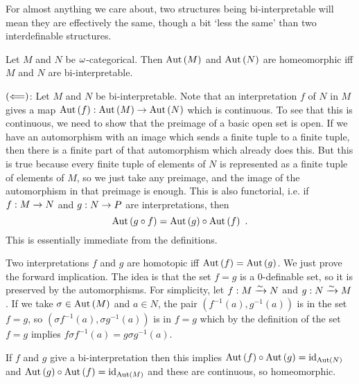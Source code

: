 \documentclass{amsart}
\begin{document}
For almost anything we care about, two structures being bi-interpretable will mean 
they are effectively the same, though a bit `less the same' than two interdefinable
structures.

\begin{thm}
Let $M$ and $N$ be $\omega$-categorical. 
Then $\operatorname{Aut}\left( M \right)$ and $\operatorname{Aut}\left( N \right)$
are homeomorphic iff $M$ and $N$ are bi-interpretable.
\end{thm}

\begin{Proof}
$\left( \Longleftarrow \right)$:
Let $M$ and $N$ be bi-interpretable.
Note that an interpretation $f$ of $N$ in $M$ gives a map 
$\operatorname{Aut}\left( f \right): \operatorname{Aut}\left( M \right) \rightarrow \operatorname{Aut}\left( N \right)$
which is continuous.
To see that this is continuous, we need to show that the preimage of a basic open set is open.
If we have an automorphism with an image which sends a finite tuple
to a finite tuple, then there is a finite part of that automorphism
which already does this. But this is true because every finite tuple of elements of $N$ is represented
as a finite tuple of elements of $M$, so we just take any preimage,
and the image of the automorphism in that preimage is enough.
This is also functorial, i.e. if $f:M\rightarrow N$ and 
$g:N\rightarrow P$ are interpretations, then 
\begin{equation}
\operatorname{Aut}\left( g\circ f \right) = \operatorname{Aut}\left( g \right) \circ \operatorname{Aut}\left( f \right) \ .
\end{equation}
This is essentially immediate from the definitions.

Two interpretations $f$ and $g$ are homotopic iff $\operatorname{Aut}\left( f \right) = \operatorname{Aut}\left( g \right)$.
We just prove the forward implication.
The idea is that the set $f=g$ is a $0$-definable set, 
so it is preserved by the automorphisms.
For simplicity, let $f: M \xrightarrow{\sim}N$
and $g: N\xrightarrow{\sim} M$. If we take $\sigma\in \operatorname{Aut}\left( M\right)$
and $a\in N$, the pair $\left( f^{-1}\left( a \right) , g^{-1}\left( a \right) \right)$
is in the set $f= g$, so
$\left( \sigma f^{-1}\left( a \right) , \sigma g^{-1} \left( a \right) \right)$ is in $f= g$
which by the definition of the set $f=g$
implies $f\sigma f^{-1}\left( a \right) = g\sigma g^{-1}\left( a \right)$. 

If $f$ and $g$ give a bi-interpretation then this implies 
$\operatorname{Aut}\left( f \right) \circ \operatorname{Aut}\left( g \right) = \operatorname{id}_{\operatorname{Aut}\left( N \right)}$
and $\operatorname{Aut}\left( g \right) \circ \operatorname{Aut}\left( f \right) = \operatorname{id}_{\operatorname{Aut}\left( M \right)}$
and these are continuous, so homeomorphic.


\end{Proof}
\end{document}
